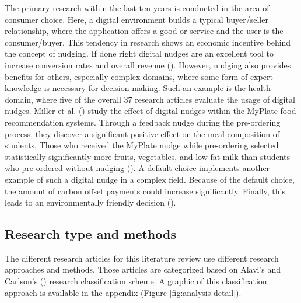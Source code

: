 The primary research within the last ten years is conducted in the area of consumer choice. Here, a digital environment builds a typical buyer/seller relationship, where the application offers a good or service and the user is the consumer/buyer. This tendency in research shows an economic incentive behind the concept of nudging. If done right digital nudges are an excellent tool to increase conversion rates and overall revenue (\cite{mirsch_making_2018}).
However, nudging also provides benefits for others, especially complex domains, where some form of expert knowledge is necessary for decision-making. Such an example is the health domain, where five of the overall 37 research articles evaluate the usage of digital nudges. Miller et al. (\citeyear{miller_effects_2016}) study the effect of digital nudges within the MyPlate food recommendation systems. Through a feedback nudge during the pre-ordering process, they discover a significant positive effect on the meal composition of students. Those who received the MyPlate nudge while pre-ordering selected statistically significantly more fruits, vegetables, and low-fat milk than students who pre-ordered without nudging (\cite{miller_effects_2016}).
A default choice implements another example of such a digital nudge in a complex field. Because of the default choice, the amount of carbon offset payments could increase significantly. Finally, this leads to an environmentally friendly decision (\cite{szekely_nudging_2016}).


\subsection{Research type and methods}
The different research articles for this literature review use different research approaches and methods. Those articles are categorized based on Alavi's and Carlson's (\citeyear{alavi_review_1992}) research classification scheme. A graphic of this classification approach is available in the appendix (Figure \ref{fig:analysis-detail}).

